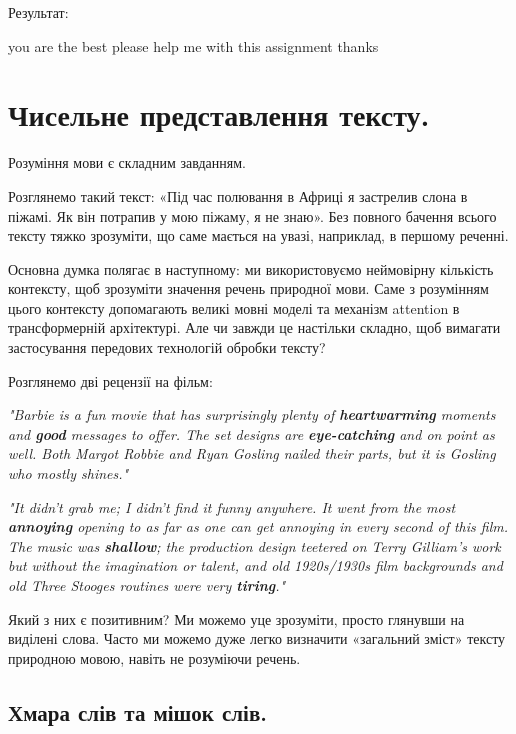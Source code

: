 Результат:

\begin{console}
you are the best  please help me with this assignment  thanks
\end{console}



\section{Чисельне представлення тексту.}

Розуміння мови є складним завданням.

Розглянемо такий текст: «Під час полювання в Африці я застрелив слона в піжамі. Як він потрапив у мою піжаму, я не знаю». Без повного бачення всього тексту тяжко зрозуміти, що саме мається на увазі, наприклад, в першому реченні.

Основна думка полягає в наступному: ми використовуємо неймовірну кількість контексту, щоб зрозуміти значення речень природної мови. Саме з розумінням цього контексту допомагають великі мовні моделі та механізм attention в трансформерній архітектурі. Але чи завжди це настільки складно, щоб вимагати застосування передових технологій обробки тексту?

Розглянемо дві рецензії на фільм:

\textit{"Barbie is a fun movie that has surprisingly plenty of \textbf{heartwarming} moments and \textbf{good} messages to offer. The set designs are \textbf{eye-catching} and on point as well. Both Margot Robbie and Ryan Gosling nailed their parts, but it is Gosling who mostly shines."}

\textit{"It didn't grab me; I didn't find it funny anywhere. It went from the most \textbf{annoying} opening to as far as one can get annoying in every second of this film. The music was \textbf{shallow}; the production design teetered on Terry Gilliam's work but without the imagination or talent, and old 1920s/1930s film backgrounds and old Three Stooges routines were very \textbf{tiring}."}

Який з них є позитивним? Ми можемо уце зрозуміти, просто глянувши на виділені слова. Часто ми можемо дуже легко визначити «загальний зміст» тексту природною мовою, навіть не розуміючи речень.

\subsection{Хмара слів та мішок слів.}

